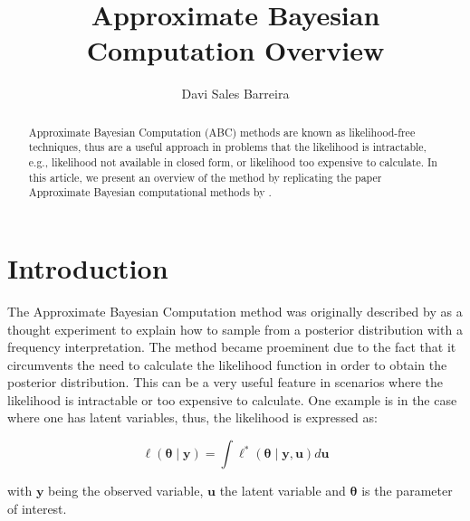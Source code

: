 \documentclass[runningheads]{llncs}
\begin{document}
%
\title{Approximate Bayesian Computation Overview}
%
%
\author{Davi Sales Barreira}
%
%
%
\maketitle              %
%
\begin{abstract}
Approximate Bayesian Computation (ABC)
methods are known as likelihood-free techniques, thus are a useful
approach in problems that the likelihood is intractable, e.g., likelihood
not available in closed form, or likelihood too expensive to calculate.
In this article, we present an overview of the method by replicating
the paper Approximate Bayesian computational
methods by \cite{Marin2012}.

\end{abstract}
%
%
%
\section{Introduction}

The Approximate Bayesian Computation method was originally described
by \citet{Rubin1984} as a thought experiment to explain how to sample
from a posterior distribution with a frequency interpretation.
The method became proeminent due to the fact that it circumvents
the need to calculate the likelihood function in order to
obtain the posterior distribution. This can be a very useful
feature in scenarios where the likelihood is intractable or
too expensive to calculate. One example is in the case where
one has latent variables, thus, the likelihood is expressed as:

\begin{equation}
  \ell(\bm\theta \mid \bm y) =
  \bm\int \ell^*(\bm\theta \mid \bm y, \bm u) d\bm u
\end{equation}

with $\bm y$ being the observed variable,
$\bm u$ the latent variable and $\bm\theta$ is the parameter of interest.
\end{document}
